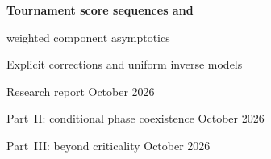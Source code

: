 \documentclass[11pt]{article}
\theoremstyle{remark}\newtheorem{remark}[theorem]{Remark}
\theoremstyle{definition}\newtheorem{definition}[theorem]{Definition}
\begin{document}
\thispagestyle{empty}
\begin{center}
{\LARGE\bfseries Tournament score sequences and\par weighted component asymptotics\par}
\vspace{9pt}
{\large Explicit corrections and uniform inverse models}\par
\vspace{8pt}
Research report October 2026\par
\vspace{3pt}
Part~II: conditional phase coexistence October 2026\par
\vspace{3pt}
Part~III: beyond criticality October 2026
\end{center}
\vspace{8pt}
\end{document}
